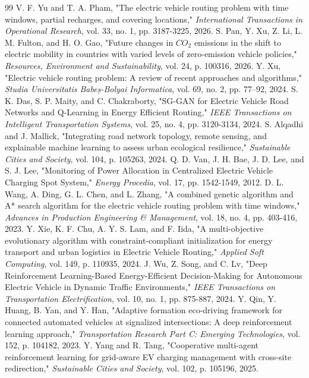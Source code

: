 \documentclass[conference]{IEEEtran}
\begin{document}
\begin{thebibliography}{99}
 V. F. Yu and T. A. Pham, "The electric vehicle routing problem with time windows, partial recharges, and covering locations," \textit{International Transactions in Operational Research}, vol. 33, no. 1, pp. 3187-3225, 2026.
 S. Pan, Y. Xu, Z. Li, L. M. Fulton, and H. O. Gao, "Future changes in $CO_{2}$ emissions in the shift to electric mobility in countries with varied levels of zero-emission vehicle policies," \textit{Resources, Environment and Sustainability}, vol. 24, p. 100316, 2026.
 Y. Xu, "Electric vehicle routing problem: A review of recent approaches and algorithms," \textit{Studia Universitatis Babeș-Bolyai Informatica}, vol. 69, no. 2, pp. 77–92, 2024.
 S. K. Das, S. P. Maity, and C. Chakraborty, "SG-GAN for Electric Vehicle Road Networks and Q-Learning in Energy Efficient Routing," \textit{IEEE Transactions on Intelligent Transportation Systems}, vol. 25, no. 4, pp. 3120-3134, 2024.
 S. Alqadhi and J. Mallick, "Integrating road network topology, remote sensing, and explainable machine learning to assess urban ecological resilience," \textit{Sustainable Cities and Society}, vol. 104, p. 105263, 2024.
 Q. D. Van, J. H. Bae, J. D. Lee, and S. J. Lee, "Monitoring of Power Allocation in Centralized Electric Vehicle Charging Spot System," \textit{Energy Procedia}, vol. 17, pp. 1542-1549, 2012.
 D. L. Wang, A. Ding, G. L. Chen, and L. Zhang, "A combined genetic algorithm and A* search algorithm for the electric vehicle routing problem with time windows," \textit{Advances in Production Engineering \& Management}, vol. 18, no. 4, pp. 403-416, 2023.
 Y. Xie, K. F. Chu, A. Y. S. Lam, and F. Iida, "A multi-objective evolutionary algorithm with constraint-compliant initialization for energy transport and urban logistics in Electric Vehicle Routing," \textit{Applied Soft Computing}, vol. 149, p. 110935, 2024.
 J. Wu, Z. Song, and C. Lv, "Deep Reinforcement Learning-Based Energy-Efficient Decision-Making for Autonomous Electric Vehicle in Dynamic Traffic Environments," \textit{IEEE Transactions on Transportation Electrification}, vol. 10, no. 1, pp. 875-887, 2024.
 Y. Qin, Y. Huang, B. Yan, and Y. Han, "Adaptive formation eco-driving framework for connected automated vehicles at signalized intersections: A deep reinforcement learning approach," \textit{Transportation Research Part C: Emerging Technologies}, vol. 152, p. 104182, 2023.
 Y. Yang and R. Tang, "Cooperative multi-agent reinforcement learning for grid-aware EV charging management with cross-site redirection," \textit{Sustainable Cities and Society}, vol. 102, p. 105196, 2025.

\end{thebibliography}
\end{document}
